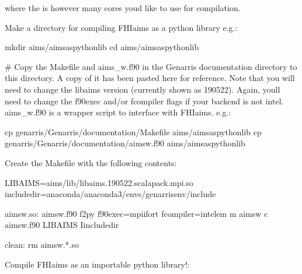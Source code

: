 \documentclass[letterpaper,10pt,english]{sphinxmanual}
\begin{document}
where the  is however many cores you\textquotesingle{}d like to use for compilation.

Make a directory for compiling FHI\sphinxhyphen{}aims as a python library
e.g.:

\begin{sphinxVerbatim}[commandchars=\\\{\}]
mkdir \PYGZdl{}aims/aims\PYGZus{}as\PYGZus{}python\PYGZus{}lib
cd \PYGZdl{}aims/aims\PYGZus{}as\PYGZus{}python\PYGZus{}lib
\end{sphinxVerbatim}

\# Copy the Makefile and aims\_w.f90 in the Genarris documentation directory to this directory. A copy of it has been pasted here for reference. Note that you will need to change the libaims version (currently shown as 190522). Again, you\textquotesingle{}ll need to change the f90exec and/or fcompiler flags if your backend is not intel. aims\_w.f90 is a wrapper script to interface with FHI\sphinxhyphen{}aims.
e.g.:

\begin{sphinxVerbatim}[commandchars=\\\{\}]
cp \PYGZdl{}genarris/Genarris/documentation/Makefile \PYGZdl{}aims/aims\PYGZus{}as\PYGZus{}python\PYGZus{}lib
cp \PYGZdl{}genarris/Genarris/documentation/aims\PYGZus{}w.f90 \PYGZdl{}aims/aims\PYGZus{}as\PYGZus{}python\PYGZus{}lib
\end{sphinxVerbatim}

Create the Makefile with the following contents:

\begin{sphinxVerbatim}[commandchars=\\\{\}]
LIBAIMS=\PYGZdl{}\PYGZob{}aims\PYGZcb{}/lib/libaims.190522.scalapack.mpi.so
include\PYGZus{}dir=\PYGZdl{}\PYGZob{}anaconda\PYGZcb{}/anaconda3/envs/genarris\PYGZus{}env/include

aims\PYGZus{}w.so: aims\PYGZus{}w.f90
    f2py \PYGZhy{}\PYGZhy{}f90exec=mpiifort \PYGZhy{}\PYGZhy{}fcompiler=intelem \PYGZhy{}m aims\PYGZus{}w \PYGZbs{}
         \PYGZhy{}c aims\PYGZus{}w.f90 \PYGZdl{}\PYGZob{}LIBAIMS\PYGZcb{} \PYGZhy{}I\PYGZdl{}\PYGZob{}include\PYGZus{}dir\PYGZcb{}

clean:
    rm aims\PYGZus{}w.*.so
\end{sphinxVerbatim}

Compile FHI\sphinxhyphen{}aims as an importable python library!:

\begin{sphinxVerbatim}[commandchars=\\\{\}]
\end{sphinxVerbatim}
\end{document}
